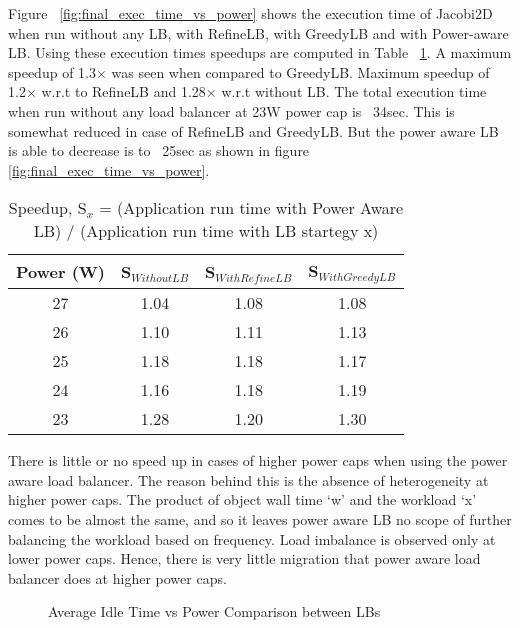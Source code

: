 Figure ~\ref{fig:final_exec_time_vs_power} shows the execution time of Jacobi2D when 
run without any LB, with RefineLB, with GreedyLB and with Power-aware LB. Using these execution times
speedups are computed in Table ~\ref{tb:1}. 
A maximum speedup of 1.3$\times$ was seen when compared
to GreedyLB. Maximum speedup of 1.2$\times$ w.r.t to RefineLB and 1.28$\times$ w.r.t without LB.
The total execution time when run without any load balancer at 23W power cap is
~34sec.  This is somewhat reduced in case of RefineLB and GreedyLB. But the
power aware LB is able to decrease is to ~25sec as shown in figure \ref{fig:final_exec_time_vs_power}. 

\begin{table}[h]
\begin{tabular}{|c|c|c|c|}
\hline
Power (W) & S$_{Without LB}$ & S$_{With Refine LB}$ & S$_{With Greedy LB}$ \\ \hline
27 & 1.04 & 1.08 & 1.08 \\ \hline
26 & 1.10 & 1.11 & 1.13 \\ \hline
25 & 1.18 & 1.18 & 1.17 \\ \hline
24 & 1.16 & 1.18 & 1.19 \\ \hline
23 & 1.28 & 1.20 & 1.30 \\ \hline
\end{tabular}
\caption{Speedup, S$_x$ = (Application run time with Power Aware LB) / (Application run time with LB startegy x) }
\label{tb:1}
\end{table}

There is little or no speed up in cases of higher power caps when using the
power aware load balancer. The reason behind this is the absence of
heterogeneity at higher power caps. The product of object wall time ‘w’ and the
workload ‘x’ comes to be almost the same, and so it leaves power aware LB no
scope of further balancing the workload based on frequency. Load imbalance is
observed only at lower power caps. Hence, there is very little migration that
power aware load balancer does at higher power caps. 

\begin{figure}
\centering
\caption{Average Idle Time vs Power Comparison between LBs}
\label{fig:avg_times_final_vs_power}
\end{figure}


